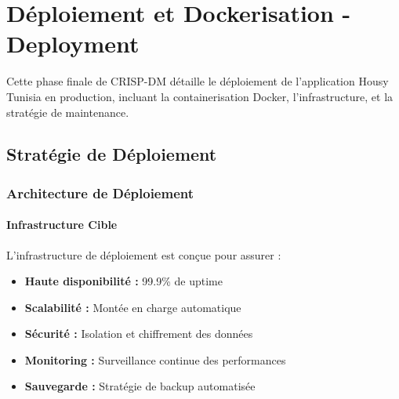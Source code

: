 \chapter{Déploiement et Dockerisation - Deployment}

\begin{objectivebox}
Cette phase finale de CRISP-DM détaille le déploiement de l'application Housy Tunisia en production, incluant la containerisation Docker, l'infrastructure, et la stratégie de maintenance.
\end{objectivebox}

\section{Stratégie de Déploiement}

\subsection{Architecture de Déploiement}

\subsubsection{Infrastructure Cible}

L'infrastructure de déploiement est conçue pour assurer :

\begin{itemize}
    \item \textbf{Haute disponibilité :} 99.9\% de uptime
    \item \textbf{Scalabilité :} Montée en charge automatique
    \item \textbf{Sécurité :} Isolation et chiffrement des données
    \item \textbf{Monitoring :} Surveillance continue des performances
    \item \textbf{Sauvegarde :} Stratégie de backup automatisée
\end{itemize}


